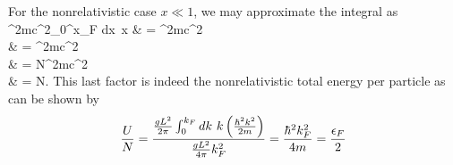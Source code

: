 \documentclass[10pt,letterpaper]{article}
\begin{document}
	\item %
	For the nonrelativistic case $x\ll 1$, we may approximate the integral as
	\ba
		^2mc^2\int_0^{x_F} dx\ x
		& = ^2mc^2 \\
		& = ^2mc^2 \\
		& = N^2mc^2 \\
		& = N.
	\ea
	This last factor is indeed the nonrelativistic total energy per particle as can be shown by
	\[
		\frac{U}{N} = \frac{\frac{gL^2}{2\pi} \int_0^{k_F} dk\ k\pfrac{\h^2k^2}{2m}}{\frac{gL^2}{4\pi}k_F^2} =
		\frac{\h^2 k_F^2}{4m} = \frac{\ep_F}{2}
	\] \\ \\
	
\end{document}
